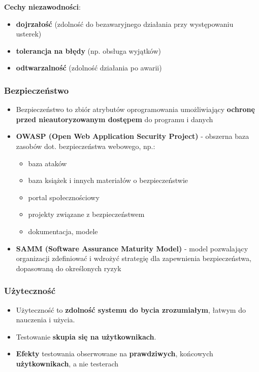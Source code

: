 \documentclass[../main.tex]{subfiles}
\begin{document}
    \textbf{Cechy niezawodności}:
    \begin{itemize}
        \item \textbf{dojrzałość} (zdolność do bezawaryjnego działania przy występowaniu usterek)
        \item \textbf{tolerancja na błędy} (np. obsługa wyjątków)
        \item \textbf{odtwarzalność} (zdolność działania po awarii)
    \end{itemize}

    \subsubsection{Bezpieczeństwo}
    \begin{itemize}
        \item Bezpieczeństwo to zbiór atrybutów oprogramowania umożliwiający \textbf{ochronę przed nieautoryzowanym
        dostępem} do programu i danych
        \item \textbf{OWASP (Open Web Application Security Project)} - obszerna baza zasobów dot. bezpieczeństwa webowego, np.:
        \begin{itemize}
            \item baza ataków
            \item baza książek i innych materiałów o bezpieczeństwie
            \item portal społecznościowy
            \item projekty związane z bezpieczeństwem
            \item dokumentacja, modele
        \end{itemize}
        \item \textbf{SAMM (Software Assurance Maturity Model)} - model pozwalający organizacji zdefiniować i wdrożyć strategię dla zapewnienia bezpieczeństwa,
        dopasowaną do określonych ryzyk
    \end{itemize}

    \subsubsection{Użyteczność}
    \begin{itemize}
        \item Użyteczność to \textbf{zdolność systemu do bycia zrozumiałym}, łatwym do nauczenia i użycia.
        \item Testowanie \textbf{skupia się na użytkownikach}.
        \item \textbf{Efekty} testowania obserwowane na \textbf{prawdziwych}, końcowych \textbf{użytkownikach}, a nie testerach
    \end{itemize}
\end{document}
